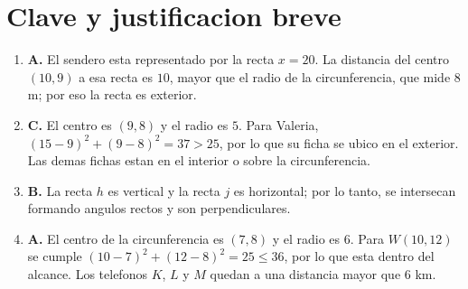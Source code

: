 \documentclass[12pt]{article}
\begin{document}
\section*{Clave y justificacion breve}

\begin{enumerate}[label=\textbf{\arabic*.}]
  \item \textbf{A.} El sendero esta representado por la recta $x=20$. La distancia del centro $(10,9)$ a esa recta es $10$, mayor que el radio de la circunferencia, que mide $8$ m; por eso la recta es exterior.
  \item \textbf{C.} El centro es $(9,8)$ y el radio es $5$. Para Valeria, $(15-9)^2+(9-8)^2=37>25$, por lo que su ficha se ubico en el exterior. Las demas fichas estan en el interior o sobre la circunferencia.
  \item \textbf{B.} La recta $h$ es vertical y la recta $j$ es horizontal; por lo tanto, se intersecan formando angulos rectos y son perpendiculares.
  \item \textbf{A.} El centro de la circunferencia es $(7,8)$ y el radio es $6$. Para $W(10,12)$ se cumple $(10-7)^2+(12-8)^2=25\leq 36$, por lo que esta dentro del alcance. Los telefonos $K$, $L$ y $M$ quedan a una distancia mayor que $6$ km.
\end{enumerate}
\end{document}
